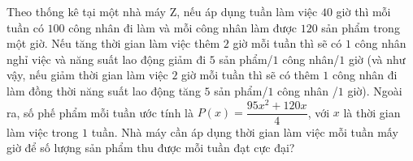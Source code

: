 \begin{ex}%
	[TL.309840]
	Theo thống kê tại một nhà máy Z, nếu áp dụng tuần làm việc $40$ giờ thì mỗi tuần có $100$ công nhân đi làm và mỗi công nhân làm được $120$ sản phẩm trong một giờ. Nếu tăng thời gian làm việc thêm $2$ giờ mỗi tuần thì sẽ có $1$ công nhân nghỉ việc và năng suất lao động giảm đi $5$ sản phẩm/$1$ công nhân/$1$ giờ (và như vậy, nếu giảm thời gian làm việc $2$ giờ mỗi tuần thì sẽ có thêm $1$ công nhân đi làm đồng thời năng suất lao động tăng $5$ sản phẩm/$1$ công nhân /$1$ giờ). Ngoài ra, số phế phẩm mỗi tuần ước tính là $P(x) = \dfrac{95x^2+120x}{4}$, với $x$ là thời gian làm việc trong $1$ tuần. Nhà máy cần áp dụng thời gian làm việc mỗi tuần mấy giờ để số lượng sản phẩm thu được mỗi tuần đạt cực đại?
\end{ex}

